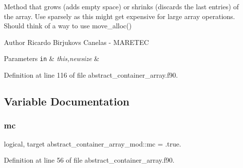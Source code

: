 Method that grows (adds empty space) or shrinks (discards the last entries) of the array. Use sparsely as this might get expensive for large array operations. Should think of a way to use move\+\_\+alloc() 

\begin{DoxyAuthor}{Author}
Ricardo Birjukovs Canelas -\/ M\+A\+R\+E\+T\+EC 
\end{DoxyAuthor}

\begin{DoxyParams}[1]{Parameters}
\mbox{\tt in}  & {\em this,newsize} & \\
\hline
\end{DoxyParams}


Definition at line 116 of file abstract\+\_\+container\+\_\+array.\+f90.



\subsection{Variable Documentation}
\mbox{\label{namespaceabstract__container__array__mod_a536c39baa7114f8ddff2dec5a90a894e}} 
\subsubsection{\texorpdfstring{mc}{mc}}
{\footnotesize\ttfamily logical, target abstract\+\_\+container\+\_\+array\+\_\+mod\+::mc = .true.\hspace{0.3cm}{\ttfamily [private]}}



Definition at line 56 of file abstract\+\_\+container\+\_\+array.\+f90.


